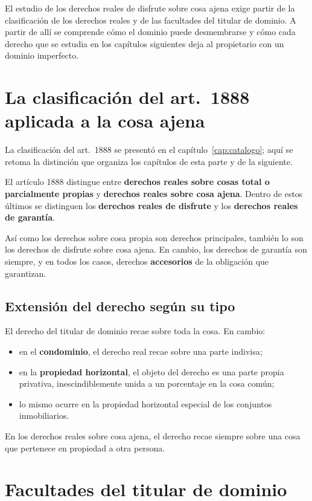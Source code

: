 \documentclass[12pt,oneside]{book}
\begin{document}
El estudio de los derechos reales de disfrute sobre cosa ajena exige partir de la clasificación de los derechos reales y de las facultades del titular de dominio. A partir de allí se comprende cómo el dominio puede desmembrarse y cómo cada derecho que se estudia en los capítulos siguientes deja al propietario con un dominio imperfecto.

\section{La clasificación del art.~1888 aplicada a la cosa ajena}

La clasificación del art.~1888 se presentó en el capítulo~\ref{cap:catalogo}; aquí se retoma la distinción que organiza los capítulos de esta parte y de la siguiente.


El artículo 1888 distingue entre \textbf{derechos reales sobre cosas total o parcialmente propias} y \textbf{derechos reales sobre cosa ajena}. Dentro de estos últimos se distinguen los \textbf{derechos reales de disfrute} y los \textbf{derechos reales de garantía}.

Así como los derechos sobre cosa propia son derechos principales, también lo son los derechos de disfrute sobre cosa ajena. En cambio, los derechos de garantía son siempre, y en todos los casos, derechos \textbf{accesorios} de la obligación que garantizan.

\subsection{Extensión del derecho según su tipo}

El derecho del titular de dominio recae sobre toda la cosa. En cambio:

\begin{itemize}
    \item en el \textbf{condominio}, el derecho real recae sobre una parte indivisa;
    \item en la \textbf{propiedad horizontal}, el objeto del derecho es una parte propia privativa, inescindiblemente unida a un porcentaje en la cosa común;
    \item lo mismo ocurre en la propiedad horizontal especial de los conjuntos inmobiliarios.
\end{itemize}

En los derechos reales sobre cosa ajena, el derecho recae siempre sobre una cosa que pertenece en propiedad a otra persona.

\section{Facultades del titular de dominio}
\end{document}
